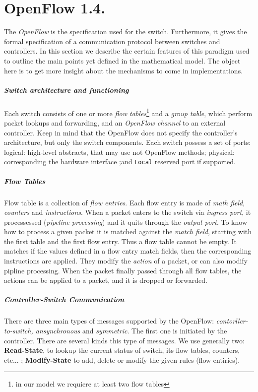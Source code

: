 \documentclass{article}
\theoremstyle{remark}
\begin{document}
\section{OpenFlow 1.4.}
The \emph{OpenFlow} is the specification used for the switch. Furthermore, it gives the formal specification of a communication protocol between switches and controllers. In this section we describe the certain features of this paradigm used to outline the main points yet defined in the mathematical model. The object here is to get more insight about the mechanisms to come in implementations.
\subparagraph{Switch architecture and functioning} Each switch consists of one or more \emph{flow tables}\footnote{in our model we requiere at least two flow tables} and a \emph{group table}, which perform packet lookups and forwarding, and an \emph{OpenFlow channel} to an external controller\cite{OpenFlow}. Keep in mind that the OpenFlow does not specify the controller's architecture, but only the switch components. 
Each switch possess a set of ports: logical: high-level abstracts, that may use not OpenFlow methods; physical: corresponding the hardware interface ;and \texttt{Local} reserved port if supported. 
\subparagraph{Flow Tables} Flow table is a collection of \emph{flow entries}. Each flow entry is made of \emph{math field}, \emph{counters} and \emph{instructions}. When a packet enters to the switch via \emph{ingress port}, it processessed (\emph{pipeline processing}) and it quits through the \emph{output port}.
To know how to process a given packet it is matched against the \emph{match field}, starting with the first table and the first flow entry. Thus a flow table cannot be empty. It matches if the values defined in a flow entry match fields, then the corresponding instructions are applied.  They modify the \emph{action} of a packet, or can also modify pipline processing. When the packet finally passed through all flow tables, the actions can be applied to a packet, and it is dropped or forwarded. 
\subparagraph{Controller-Switch Communication} There are three main types of messages supported by the OpenFlow: \emph{contorller-to-switch, ansynchronous} and \emph{symmetric}.
The first one is initiated by the controller. There are several kinds this type of messages. We use generally two: \textbf{Read-State}, to lookup the current status of switch, its flow tables, counters, etc... ; \textbf{Modify-State} to add, delete or modify the given rules (flow entiries).
\end{document}
